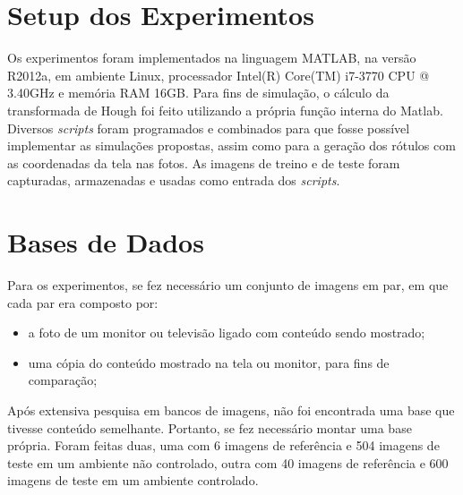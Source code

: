 
\section{Setup dos Experimentos}

Os experimentos foram implementados na linguagem MATLAB, na versão R2012a, em ambiente Linux, processador Intel(R) Core(TM) i7-3770 CPU @ 3.40GHz e memória RAM 16GB. Para fins de simulação, o cálculo da transformada de Hough foi feito utilizando a própria função interna do Matlab. Diversos \textit{scripts} foram programados e combinados para que fosse possível implementar as simulações propostas, assim como para a geração dos rótulos com as coordenadas da tela nas fotos. As imagens de treino e de teste foram capturadas, armazenadas e usadas como entrada dos \textit{scripts}.


\section{Bases de Dados}



Para os experimentos, se fez necessário um conjunto de imagens em par, em que cada par era composto por:
\begin{itemize}
\item a foto de um monitor ou televisão ligado com conteúdo sendo mostrado;
\item uma cópia do conteúdo mostrado na tela ou monitor, para fins de comparação;
\end{itemize}

Após extensiva pesquisa em bancos de imagens, não foi encontrada uma base que tivesse conteúdo semelhante. Portanto, se fez necessário montar uma base própria. Foram feitas duas, uma com 6 imagens de referência e 504 imagens de teste em um ambiente não controlado, outra com 40 imagens de referência e 600 imagens de teste em um ambiente controlado.


